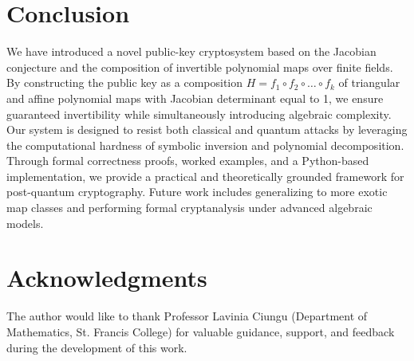 \documentclass[12pt]{article}
\begin{document}
\section{Conclusion}

We have introduced a novel public-key cryptosystem based on the Jacobian conjecture and the composition of invertible polynomial maps over finite fields. By constructing the public key as a composition \( H = f_1 \circ f_2 \circ \dots \circ f_k \) of triangular and affine polynomial maps with Jacobian determinant equal to 1, we ensure guaranteed invertibility while simultaneously introducing algebraic complexity. Our system is designed to resist both classical and quantum attacks by leveraging the computational hardness of symbolic inversion and polynomial decomposition. Through formal correctness proofs, worked examples, and a Python-based implementation, we provide a practical and theoretically grounded framework for post-quantum cryptography. Future work includes generalizing to more exotic map classes and performing formal cryptanalysis under advanced algebraic models.

\section*{Acknowledgments}
The author would like to thank Professor Lavinia Ciungu (Department of Mathematics, St. Francis College) for valuable guidance, support, and feedback during the development of this work.
\end{document}
